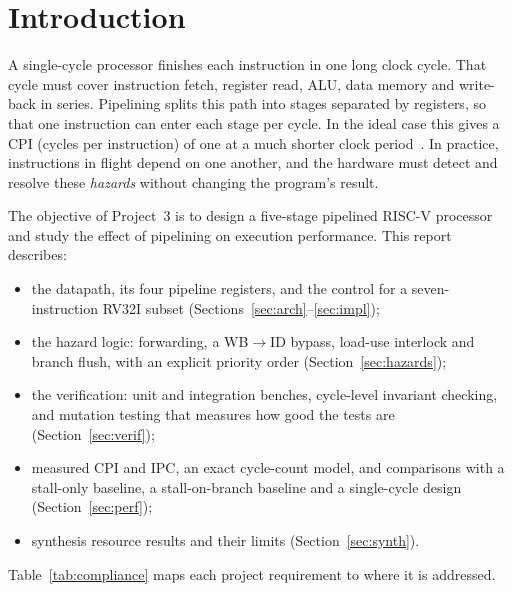 \documentclass[conference]{IEEEtran}
\begin{document}
\section{Introduction}

A single-cycle processor finishes each instruction in one long clock cycle. That cycle must cover instruction fetch, register read, ALU, data memory and write-back in series. Pipelining splits this path into stages separated by registers, so that one instruction can enter each stage per cycle. In the ideal case this gives a CPI (cycles per instruction) of one at a much shorter clock period~\cite{patterson-riscv,hennessy-quant}. In practice, instructions in flight depend on one another, and the hardware must detect and resolve these \emph{hazards} without changing the program's result.

The objective of Project~3 is to design a five-stage pipelined RISC-V processor and study the effect of pipelining on execution performance. This report describes:
\begin{itemize}
  \item the datapath, its four pipeline registers, and the control for a seven-instruction RV32I subset (Sections~\ref{sec:arch}--\ref{sec:impl});
  \item the hazard logic: forwarding, a WB$\rightarrow$ID bypass, load-use interlock and branch flush, with an explicit priority order (Section~\ref{sec:hazards});
  \item the verification: unit and integration benches, cycle-level invariant checking, and mutation testing that measures how good the tests are (Section~\ref{sec:verif});
  \item measured CPI and IPC, an exact cycle-count model, and comparisons with a stall-only baseline, a stall-on-branch baseline and a single-cycle design (Section~\ref{sec:perf});
  \item synthesis resource results and their limits (Section~\ref{sec:synth}).
\end{itemize}
Table~\ref{tab:compliance} maps each project requirement to where it is addressed.
\end{document}
